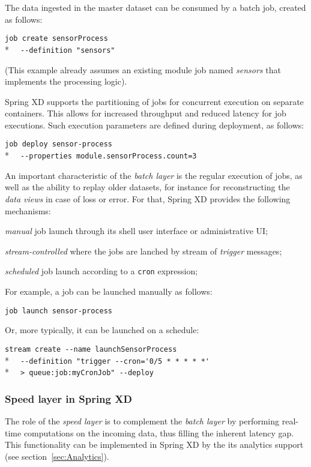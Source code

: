 The data ingested in the master dataset can be consumed by a batch job,
created as follows:

\verb;job create sensorProcess;\\*
\verb;  --definition "sensors";

(This example already assumes an existing module job named \emph{sensors} that
implements the processing logic).

Spring XD supports the partitioning of jobs for concurrent execution on
separate containers. This allows for increased throughput and reduced latency
for job executions. Such execution parameters are defined during deployment,
as follows:

\verb;job deploy sensor-process;\\*
\verb;  --properties module.sensorProcess.count=3;

An important characteristic of the \emph{batch layer} is the regular
execution of jobs, as well as the ability to replay older datasets, for
instance for reconstructing the \emph{data views} in case of loss or error.
For that, Spring XD provides the following mechanisms:

\begin{itemize*}
\item \emph{manual} job launch through its shell user interface or 
administrative UI;
\item \emph{stream-controlled} where the jobs are lanched by stream of 
\emph{trigger} messages;
\item \emph{scheduled} job launch according to a \texttt{cron} expression;
\end{itemize*}

For example, a job can be launched manually as follows:

\verb;job launch sensor-process;

Or, more typically, it can be launched on a schedule:

\verb;stream create --name launchSensorProcess;\\*
\verb;  --definition "trigger --cron='0/5 * * * * *';\\* 
\verb;  > queue:job:myCronJob" --deploy;

\subsubsection {Speed layer in Spring XD}

The role of the \emph{speed layer} is to complement the \emph{batch layer} 
by performing real-time computations on the incoming data, thus filling the 
inherent latency gap. This functionality can be implemented in Spring XD by 
the its analytics support (see section~\ref{sec:Analytics}).

